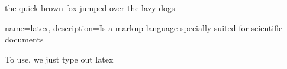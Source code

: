 \documentclass[12pt]{report}
\begin{document}
\tableofcontents 
\pagebreak 


the quick brown fox jumped over the lazy dogs


{
    name=latex,
    description={Is a markup language specially suited 
    for scientific documents}
}

To use, we just type out \Gls{latex}

\printglossaries
\printindex

\end{document}
